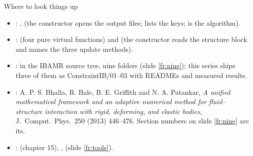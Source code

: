 \documentclass[aspectratio=169,11pt]{beamer}
\begin{document}
\begin{frame}{Where to look things up}
\label{fr:lookup}
\small
\begin{itemize}
  \item {}: ,  (the constructor opens the output files;  lists the keys;  is the algorithm).
  \item {}:  (four pure virtual functions) and  (the  constructor reads the structure block and names the three update methods).
  \item {}:  in the IBAMR source tree, nine folders (slide \ref{fr:nine}); this series ships three of them as ConstraintIB/01--03 with READMEs and measured results.
  \item {}: A. P. S. Bhalla, R. Bale, B. E. Griffith and N. A. Patankar, \emph{A unified mathematical framework and an adaptive numerical method for fluid--structure interaction with rigid, deforming, and elastic bodies}, J.\ Comput.\ Phys.\ 250 (2013) 446--476. Section numbers on slide \ref{fr:nine} are its.
  \item {}:  (chapter 15), ,  (slide \ref{fr:tools}).
\end{itemize}
\end{frame}
\end{document}
